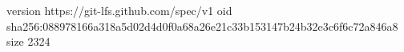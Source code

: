 version https://git-lfs.github.com/spec/v1
oid sha256:088978166a318a5d02d4d0f0a68a26e21c33b153147b24b32e3c6f6c72a846a8
size 2324
